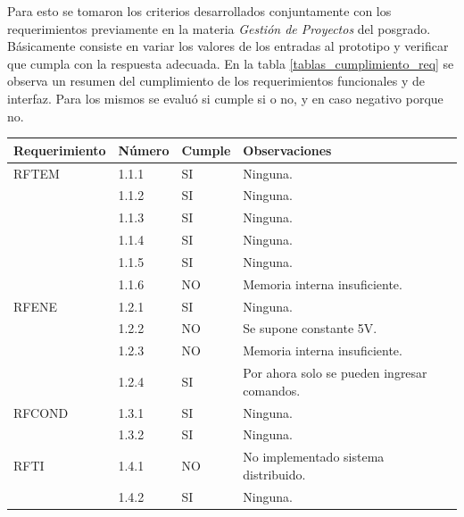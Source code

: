 Para esto se tomaron los criterios desarrollados conjuntamente con los requerimientos previamente en la materia \emph{Gestión de Proyectos} del posgrado. Básicamente consiste en variar los valores de los entradas al prototipo y verificar que cumpla con la respuesta adecuada. En la tabla \ref{tablas_cumplimiento_req} se observa un resumen del cumplimiento de los requerimientos funcionales y de interfaz. Para los mismos se evaluó si cumple si o no, y en caso negativo porque no.
\begin{table}[h!]
\begin{flushleft}
\begin{tabular}{|m{2.6cm}|m{1.5cm}|m{1.5cm}|m{6.8cm}|}\hline
{\textbf{Requerimiento}} & {\textbf{Número}} & {\textbf{Cumple}} & {\textbf{Observaciones}}\\ \hline
\multicolumn{1}{|l|}{RFTEM} & { 1.1.1 } & { SI } & { Ninguna. }\\ \cline{ 2- 4}
\multicolumn{1}{|l|}{} & { 1.1.2 } & { SI } & { Ninguna. } \\ \cline{ 2- 4}
\multicolumn{1}{|l|}{} & { 1.1.3 } & { SI } & { Ninguna. } \\ \cline{ 2- 4}
\multicolumn{1}{|l|}{} & { 1.1.4 } & { SI } & { Ninguna. } \\ \cline{ 2- 4}
\multicolumn{1}{|l|}{} & { 1.1.5 } & { SI } & { Ninguna. } \\ \cline{ 2- 4}
\multicolumn{1}{|l|}{} & { 1.1.6 } & { NO } & { Memoria interna insuficiente. } \\ \hline
\multicolumn{1}{|l|}{RFENE} & { 1.2.1 } & { SI } & { Ninguna. }\\ \cline{ 2- 4} 
\multicolumn{1}{|l|}{} & { 1.2.2 } & { NO } & { Se supone constante 5V. } \\ \cline{ 2- 4}
\multicolumn{1}{|l|}{} & { 1.2.3 } & { NO } & { Memoria interna insuficiente. } \\ \cline{ 2- 4}
\multicolumn{1}{|l|}{} & { 1.2.4 } & { SI } & { Por ahora solo se pueden ingresar comandos. } \\ \hline
\multicolumn{1}{|l|}{RFCOND} & { 1.3.1 } & { SI } & { Ninguna. }\\ \cline{ 2- 4} 
\multicolumn{1}{|l|}{} & { 1.3.2 } & { SI } & { Ninguna. }\\ \hline
\multicolumn{1}{|l|}{RFTI} & { 1.4.1 } & { NO } & { No implementado sistema distribuido. }\\ \cline{ 2- 4} 
\multicolumn{1}{|l|}{} & { 1.4.2 } & { SI } & { Ninguna. }\\ \cline{ 2- 4} 

\end{tabular}
\end{flushleft}
\end{table}
